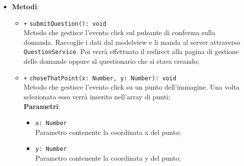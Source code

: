 \begin{itemize}
\begin{itemize}
	\item \textbf{Metodi}:
	\begin{itemize}
			\item \texttt{+} \texttt{submitQuestion(): void}\\ 
			Metodo che gestisce l’evento click sul pulsante di conferma sulla domanda. Raccoglie i dati dal modelview e li manda al server attraverso \texttt{QuestionService}. Poi verrà effettuato il redirect alla pagina di gestione delle domande oppure al questionario che si stava creando; 
			\item \texttt{+} \texttt{choseThatPoint(x: Number, y: Number): void}\\
			Metodo che gestisce l’evento click su un punto dell'immagine. Una volta selezionato esso verrà inserito nell'array di punti; \\
			\textbf{Parametri}:
			\begin{itemize}
				\item \texttt{x: Number} \\
				Parametro contenente la coordinata x del punto;
				\item \texttt{y: Number} \\ 
				Parametro contenente la coordinata y del punto;
			\end{itemize}
	\end{itemize}
\end{itemize}
\end{itemize}

